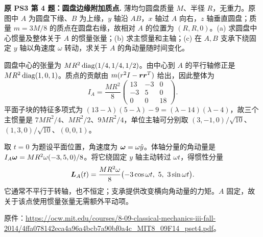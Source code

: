 \begin{example}
\textbf{原 PS3 第 4 题：圆盘边缘附加质点.} 
薄均匀圆盘质量 $M$、半径 $R$，无重力。原图中 $A$ 为圆盘下缘、$B$ 为上缘，$y$ 轴沿 $AB$，$x$ 轴过 $A$ 向右，$z$ 轴垂直圆盘；质量 $m=3M/8$ 的质点在圆盘右缘，故相对 $A$ 的位置为 $(R,R,0)$。(a) 求圆盘中心惯量及整体关于 $A$ 的惯量张量；(b) 求主惯量和主轴；(c) 在 $A,B$ 支承下绕固定 $y$ 轴以角速度 $\omega$ 转动，求关于 $A$ 的角动量随时间变化。
\end{example}
\begin{solution}
圆盘中心的张量为 $MR^2\operatorname{diag}(1/4,1/4,1/2)$。由中心到 $A$ 的平行轴修正是 $MR^2\operatorname{diag}(1,0,1)$。质点的贡献由 $m(r^2I-\boldsymbol{r}\boldsymbol{r}^T)$ 给出，因此整体为
\[
 I_A=\frac{MR^2}{8}\begin{pmatrix}13&-3&0\\-3&5&0\\0&0&18\end{pmatrix}.
\]
平面子块的特征多项式为 $(13-\lambda)(5-\lambda)-9=(\lambda-14)(\lambda-4)$，故三个主惯量是 $7MR^2/4$、$MR^2/2$、$9MR^2/4$，单位主轴可分别取 $(3,-1,0)/\sqrt{10}$、$(1,3,0)/\sqrt{10}$、$(0,0,1)$。

取 $t=0$ 为题设平面位置，角速度为 $\boldsymbol{\omega}=\omega\hat y$。体轴分量的角动量是 $I_A\boldsymbol{\omega}=MR^2\omega(-3,5,0)/8$。将它绕固定 $y$ 轴主动转过 $\omega t$，得惯性分量
\[
 \boldsymbol{L}_A(t)=\frac{MR^2\omega}{8}
 \bigl(-3\cos\omega t,\ 5,\ 3\sin\omega t\bigr).
\]
它通常不平行于转轴，也不恒定；支承提供改变横向角动量的力矩。$A$ 固定，故关于该点使用惯量张量无需额外平动项。
\end{solution}

原件：\url{https://ocw.mit.edu/courses/8-09-classical-mechanics-iii-fall-2014/4ffa078142eca4a96a4bcb7a90bf0a4c_MIT8_09F14_pset4.pdf}。

